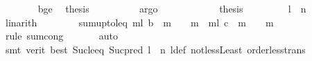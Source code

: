 \begin{isabellebody}
\isanewline
\ \ \ \ \ \ \isamarkupfalse%
\ b{\isacharunderscore}{\kern0pt}ge\ \isamarkupfalse%
\ {\isacharquery}{\kern0pt}thesis\isanewline
\ \ \ \ \ \ \ \ \isamarkupfalse%
\ argo\isanewline
\ \ \ \ \isacommand{{\isacharbraceright}{\kern0pt}}\isamarkupfalse%
\isanewline
\ \ \ \ \isamarkupfalse%
\ \isamarkupfalse%
\ {\isacharquery}{\kern0pt}thesis\isanewline
\ \ \ \ \ \ \isamarkupfalse%
\ {\isacharasterisk}{\kern0pt}\ {\isacartoucheopen}l\ {\isacharless}{\kern0pt}\ n{\isacartoucheclose}\ \isamarkupfalse%
\ linarith\isanewline
\ \ \isamarkupfalse%
\isanewline
\ \ \isamarkupfalse%
\ \isamarkupfalse%
\ sum{\isacharunderscore}{\kern0pt}upto{\isacharunderscore}{\kern0pt}l{\isacharunderscore}{\kern0pt}eq{\isacharcolon}{\kern0pt}\ {\isachardoublequoteopen}{\isacharparenleft}{\kern0pt}{\isasymSum}m{\isasymin}{\isacharbraceleft}{\kern0pt}{}{\isachardot}{\kern0pt}{\isachardot}{\kern0pt}l{\isacharbraceright}{\kern0pt}{\isachardot}{\kern0pt}\ {\isacharparenleft}{\kern0pt}b\ {\isacharbang}{\kern0pt}\ {\isacharparenleft}{\kern0pt}m{\isacharminus}{\kern0pt}{}{\isacharparenright}{\kern0pt}{\isacharparenright}{\kern0pt}\ {\isacharslash}{\kern0pt}\ {}\ {\isacharcircum}{\kern0pt}\ m{\isacharparenright}{\kern0pt}\ {\isacharequal}{\kern0pt}\ {\isacharparenleft}{\kern0pt}{\isasymSum}m{\isasymin}{\isacharbraceleft}{\kern0pt}{}{\isachardot}{\kern0pt}{\isachardot}{\kern0pt}l{\isacharbraceright}{\kern0pt}{\isachardot}{\kern0pt}\ {\isacharparenleft}{\kern0pt}c\ {\isacharbang}{\kern0pt}\ {\isacharparenleft}{\kern0pt}m{\isacharminus}{\kern0pt}{}{\isacharparenright}{\kern0pt}{\isacharparenright}{\kern0pt}\ {\isacharslash}{\kern0pt}\ {}\ {\isacharcircum}{\kern0pt}\ m{\isacharparenright}{\kern0pt}{\isachardoublequoteclose}\isanewline
\ \ \ \ \isamarkupfalse%
\ {\isacharparenleft}{\kern0pt}rule\ sum{\isachardot}{\kern0pt}cong{\isacharparenright}{\kern0pt}\isanewline
\ \ \ \ \ \isamarkupfalse%
\ auto\isanewline
\ \ \ \ \isamarkupfalse%
\ {\isacharparenleft}{\kern0pt}smt\ {\isacharparenleft}{\kern0pt}verit{\isacharcomma}{\kern0pt}\ best{\isacharparenright}{\kern0pt}\ Suc{\isacharunderscore}{\kern0pt}le{\isacharunderscore}{\kern0pt}eq\ Suc{\isacharunderscore}{\kern0pt}pred\ {\isacartoucheopen}l\ {\isacharless}{\kern0pt}\ n{\isacartoucheclose}\ l{\isacharunderscore}{\kern0pt}def\ not{\isacharunderscore}{\kern0pt}less{\isacharunderscore}{\kern0pt}Least\ order{\isacharunderscore}{\kern0pt}less{\isacharunderscore}{\kern0pt}trans{\isacharparenright}{\kern0pt}\isanewline

\end{isabellebody}
